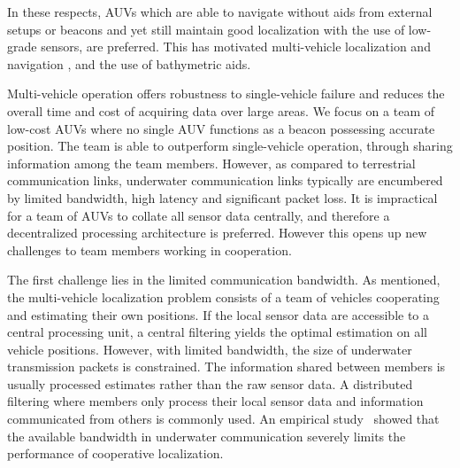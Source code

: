 In these respects, AUVs which are able to navigate without aids from external setups or beacons and yet still maintain good localization with the use of low-grade sensors, are preferred. This has motivated multi-vehicle localization and navigation \cite{Martins2003,Busquets2012,Gao2010}, and the use of bathymetric aids. 

Multi-vehicle operation offers robustness to single-vehicle failure and reduces the overall time and cost of acquiring data over large areas. We focus on a team of low-cost AUVs where no single AUV functions as a beacon possessing accurate position. The team is able to outperform single-vehicle operation, through sharing information among the team members. However, as compared to terrestrial communication links, underwater communication links typically are encumbered by limited bandwidth, high latency and significant packet loss. It is impractical for a team of AUVs to collate all sensor data centrally, and therefore a decentralized processing architecture is preferred. However this opens up new challenges to team members working in cooperation.

The first challenge lies in the limited communication bandwidth. As mentioned, the multi-vehicle localization problem consists of a team of vehicles cooperating and estimating their own positions. If the local sensor data are accessible to a central processing unit, a central filtering yields the optimal estimation on all vehicle positions. However, with limited bandwidth, the size of underwater transmission packets is constrained. The information shared between members is usually processed estimates rather than the raw sensor data. A distributed filtering where members only process their local sensor data and information communicated from others is commonly used. An empirical study~\cite{William2015Journal} showed that the available bandwidth in underwater communication severely limits the performance of cooperative localization.

